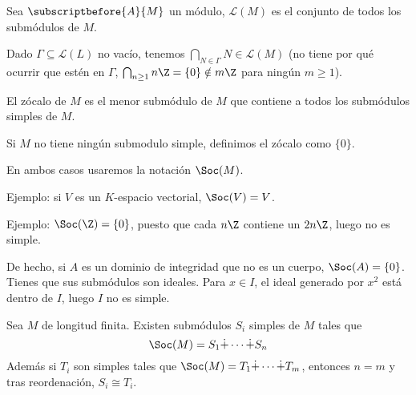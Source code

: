 Sea \(\subscriptbefore{A}{M}\) un módulo, \(\mathcal{L}(M)\)
es el conjunto de todos los submódulos de \(M\).

Dado \(\Gamma\subseteq\mathcal{L}(L)\) no vacío,
tenemos \(\bigcap_{N\in\Gamma}
N\in\mathcal{L}(M)\) (no tiene por qué ocurrir que estén en \(\Gamma\),
\(\bigcap_{n\ge 1} n\Z=\{0\}\notin m\Z\) para ningún \(m\ge 1\)).


\begin{df}[Zócalo]
  El zócalo de \(M\) es el menor submódulo de \(M\) que contiene a todos
  los submódulos simples de \(M\).

  Si \(M\) no tiene ningún submodulo simple, definimos el zócalo como
  \(\{0\}\).

  En ambos casos usaremos la notación \(\Soc(M)\).
\end{df}

Ejemplo: si \(V\) es un \(K\)-espacio vectorial, \(\Soc(V)=V\).

Ejemplo: \(\Soc(\Z)=\{0\}\), puesto que cada \(n\Z\) contiene
un \(2n\Z\), luego no es simple.

De hecho, si \(A\) es un dominio de
integridad que no es un cuerpo, \(\Soc(A)=\{0\}\). Tienes que sus submódulos
son ideales. Para \(x\in I\), el ideal generado por \(x^2\) está dentro de
\(I\), luego \(I\) no es simple.

\begin{prop}
  Sea \(M\) de longitud finita. Existen submódulos \(S_i\) simples de \(M\)
  tales que
  \[
    \Soc(M)=S_1\dot{+}\cdots\dot{+} S_n
  \]
  Además si \(T_i\) son simples tales que
  \(
    \Soc(M)=T_1\dot{+}\cdots\dot{+} T_m
  \), entonces \(n=m\) y tras reordenación, \(S_i\cong T_i\).
\end{prop}

